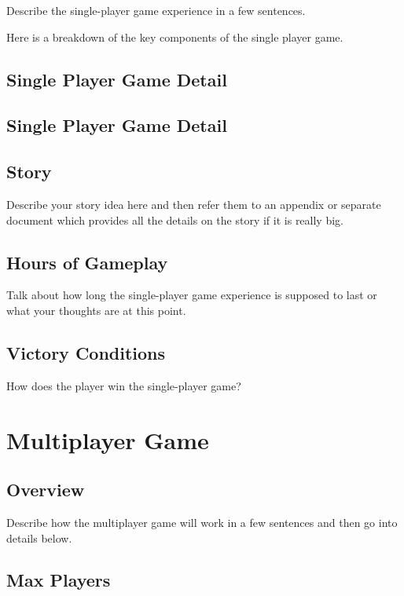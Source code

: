 \documentclass[a4paper]{report}
\begin{document}
		Describe the single-player game experience in a few sentences.

		Here is a breakdown of the key components of the single player game.

	\section{Single Player Game Detail}

	\section{Single Player Game Detail}

	\section{Story}

		Describe your story idea here and then refer them to an appendix or separate document which provides all the details on the story if it is really big.

	\section{Hours of Gameplay}

		Talk about how long the single-player game experience is supposed to last or what your thoughts are at this point.

	\section{Victory Conditions}

		How does the player win the single-player game?

\chapter{Multiplayer Game}

	\section{Overview}

		Describe how the multiplayer game will work in a few sentences and then go into details below.

	\section{Max Players}
\end{document}
